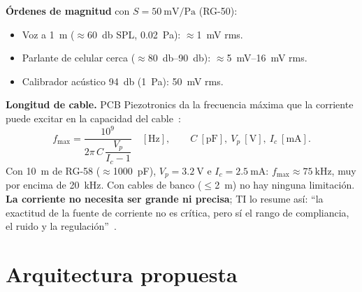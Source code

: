 \documentclass[11pt,a4paper]{article}
\begin{document}
\textbf{Órdenes de magnitud} con $S=\SI{50}{\milli\volt\per\pascal}$ (RG-50):
\begin{itemize}
  \item Voz a \SI{1}{\metre} ($\approx$\SI{60}{\decibel} SPL, \SI{0.02}{\pascal}): $\approx$\SI{1}{\milli\volt} rms.
  \item Parlante de celular cerca ($\approx$\SIrange{80}{90}{\decibel}): $\approx$\SIrange{5}{16}{\milli\volt} rms.
  \item Calibrador acústico \SI{94}{\decibel} (\SI{1}{\pascal}): \SI{50}{\milli\volt} rms.
\end{itemize}

\textbf{Longitud de cable.} PCB Piezotronics da la frecuencia máxima que la corriente puede excitar en la capacidad del cable~\cite{pcbcable}:
\begin{equation}
  f_{\max} = \frac{10^9}{2\pi\, C\, \dfrac{V_p}{I_c - 1}}\quad [\si{\hertz}],\qquad C\ [\si{\pico\farad}],\ V_p\ [\si{\volt}],\ I_c\ [\si{\milli\ampere}].
\end{equation}
Con \SI{10}{\metre} de RG-58 ($\approx$\SI{1000}{\pico\farad}), $V_p=\SI{3.2}{\volt}$ e $I_c=\SI{2.5}{\milli\ampere}$:
$f_{\max}\approx\SI{75}{\kilo\hertz}$, muy por encima de \SI{20}{\kilo\hertz}. Con cables de banco ($\leq$\SI{2}{\metre}) no hay
ninguna limitación. \textbf{La corriente no necesita ser grande ni precisa}; TI lo resume así: ``la exactitud de la
fuente de corriente no es crítica, pero sí el rango de compliancia, el ruido y la regulación''~\cite{tida010249}.

\section{Arquitectura propuesta}
\end{document}
